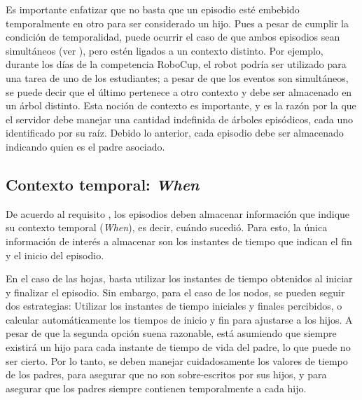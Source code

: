 Es importante enfatizar que no basta que un episodio esté embebido temporalmente en otro para ser considerado un hijo. Pues a pesar de cumplir la condición de temporalidad, puede ocurrir el caso de que ambos episodios sean simultáneos (ver ), pero estén ligados a un contexto distinto. Por ejemplo, durante los días de la competencia RoboCup, el robot podría ser utilizado para una tarea de uno de los estudiantes; a pesar de que los eventos son simultáneos, se puede decir que el último pertenece a otro contexto y debe ser almacenado en un árbol distinto. Esta noción de contexto es importante, y es la razón por la que el servidor debe manejar una cantidad indefinida de árboles episódicos, cada uno identificado por su raíz. Debido lo anterior, cada episodio debe ser almacenado indicando quien es el padre asociado.



\subsection{Contexto temporal: \textit{When}}\label{sec:design_ep_when}


De acuerdo al requisito , los episodios deben almacenar información que indique su contexto temporal (\textit{When}), es decir, cuándo  sucedió. Para esto, la única información de interés a almacenar son los instantes de tiempo que indican el fin y el inicio del episodio.

En el caso de las hojas, basta utilizar los instantes de tiempo obtenidos al iniciar y finalizar el episodio. Sin embargo, para el caso de los nodos, se pueden seguir dos estrategias: Utilizar los instantes de tiempo iniciales y finales percibidos, o calcular automáticamente los tiempos de inicio y fin para ajustarse a los hijos. A pesar de que la segunda opción suena razonable, está asumiendo que siempre existirá un hijo para cada instante de tiempo de vida del padre, lo que puede no ser cierto. Por lo tanto, se deben manejar cuidadosamente los valores de tiempo de los padres, para asegurar que no son sobre-escritos por sus hijos, y para asegurar que los padres siempre contienen temporalmente a cada hijo.


